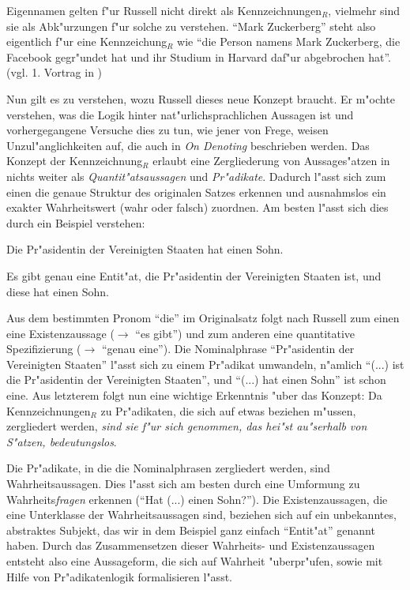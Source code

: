 \documentclass[a4paper, emulatestandardclasses, 12pt]{scrartcl}
\begin{document}
\begin{onehalfspace}
Eigennamen gelten f"ur Russell nicht direkt als Kennzeichnungen$_{R}$, vielmehr sind sie als Abk"urzungen f"ur solche zu verstehen. "`Mark Zuckerberg"' steht also eigentlich f"ur eine Kennzeichung$_{R}$ wie "`die Person namens Mark Zuckerberg, die Facebook gegr"undet hat und ihr Studium in Harvard daf"ur abgebrochen hat"'. (vgl. 1. Vortrag in \cite{kripke1972naming})

Nun gilt es zu verstehen, wozu Russell dieses neue Konzept braucht. Er m"ochte verstehen, was die Logik hinter nat"urlichsprachlichen Aussagen ist und vorhergegangene Versuche dies zu tun, wie jener von Frege, weisen Unzul"anglichkeiten auf, die auch in \emph{On Denoting} beschrieben werden. Das Konzept der Kennzeichnung$_{R}$ erlaubt eine Zergliederung von Aussages"atzen in nichts weiter als \emph{Quantit"atsaussagen} und \emph{Pr"adikate}. Dadurch l"asst sich zum einen die genaue Struktur des originalen Satzes erkennen und ausnahmslos ein exakter Wahrheitswert (wahr oder falsch) zuordnen. Am besten l"asst sich dies durch ein Beispiel verstehen:\newpage

\begin{description}[leftmargin=!,labelwidth=\widthof{\bfseries Zergliederung}]
    \item[Originalsatz] Die Pr"asidentin der Vereinigten Staaten hat einen Sohn.
    \item[Zergliederung] Es gibt genau eine Entit"at, die Pr"asidentin der Vereinigten Staaten ist, und diese hat einen Sohn. 
\end{description}

Aus dem bestimmten Pronom "`die"' im Originalsatz folgt nach Russell zum einen eine Existenzaussage ($\rightarrow$ "`es gibt"') und zum anderen eine quantitative Spezifizierung ($\rightarrow$ "`genau eine"'). Die Nominalphrase "`Pr"asidentin der Vereinigten Staaten"' l"asst sich zu einem Pr"adikat umwandeln, n"amlich "`(...) ist die Pr"asidentin der Vereinigten Staaten"', und "`(...) hat einen Sohn"' ist schon eine. Aus letzterem folgt nun eine wichtige Erkenntnis "uber das Konzept: Da Kennzeichnungen$_{R}$  zu Pr"adikaten, die sich auf etwas beziehen m"ussen, zergliedert werden, \emph{sind sie f"ur sich genommen, das hei"st au"serhalb von S"atzen, bedeutungslos}. 

Die Pr"adikate, in die die Nominalphrasen zergliedert werden, sind Wahrheitsaussagen. Dies l"asst sich am besten durch eine Umformung zu Wahrheits\emph{fragen} erkennen ("`Hat (...) einen Sohn?"'). Die Existenzaussagen, die eine Unterklasse der Wahrheitsaussagen sind, beziehen sich auf ein unbekanntes, abstraktes Subjekt, das wir in dem Beispiel ganz einfach "`Entit"at"' genannt haben. Durch das Zusammensetzen dieser Wahrheits- und Existenzaussagen entsteht also eine Aussageform, die sich auf Wahrheit "uberpr"ufen, sowie mit Hilfe von Pr"adikatenlogik formalisieren l"asst.


\end{onehalfspace}
\end{document}
